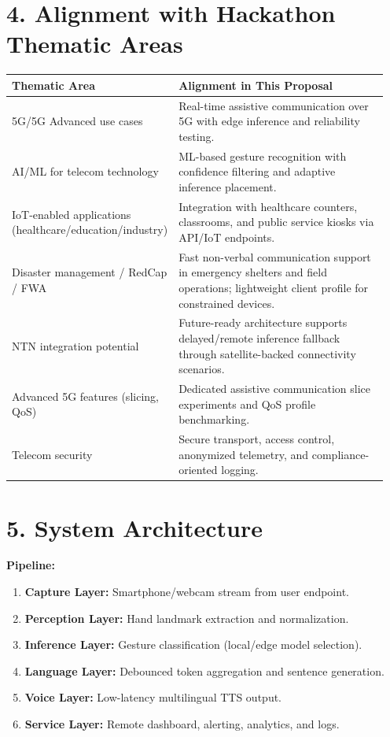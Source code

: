 \documentclass[11pt,a4paper]{article}
\begin{document}
\section*{4. Alignment with Hackathon Thematic Areas}
\begin{longtable}{p{0.35\linewidth} p{0.6\linewidth}}
\toprule
\textbf{Thematic Area} & \textbf{Alignment in This Proposal} \\
\midrule
5G/5G Advanced use cases & Real-time assistive communication over 5G with edge inference and reliability testing. \\
AI/ML for telecom technology & ML-based gesture recognition with confidence filtering and adaptive inference placement. \\
IoT-enabled applications (healthcare/education/industry) & Integration with healthcare counters, classrooms, and public service kiosks via API/IoT endpoints. \\
Disaster management / RedCap / FWA & Fast non-verbal communication support in emergency shelters and field operations; lightweight client profile for constrained devices. \\
NTN integration potential & Future-ready architecture supports delayed/remote inference fallback through satellite-backed connectivity scenarios. \\
Advanced 5G features (slicing, QoS) & Dedicated assistive communication slice experiments and QoS profile benchmarking. \\
Telecom security & Secure transport, access control, anonymized telemetry, and compliance-oriented logging. \\
\bottomrule
\end{longtable}

\section*{5. System Architecture}
\textbf{Pipeline:}
\begin{enumerate}
    \item \textbf{Capture Layer:} Smartphone/webcam stream from user endpoint.
    \item \textbf{Perception Layer:} Hand landmark extraction and normalization.
    \item \textbf{Inference Layer:} Gesture classification (local/edge model selection).
    \item \textbf{Language Layer:} Debounced token aggregation and sentence generation.
    \item \textbf{Voice Layer:} Low-latency multilingual TTS output.
    \item \textbf{Service Layer:} Remote dashboard, alerting, analytics, and logs.
\end{enumerate}
\end{document}
